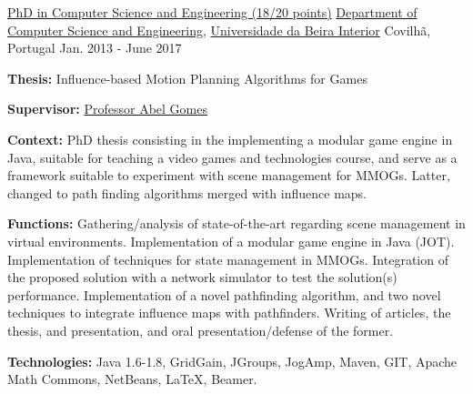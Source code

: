 

\begin{cventries}

  \cventry
    {\href{https://www.ubi.pt/en/course/849}{PhD in Computer Science and Engineering (18/20 points)}} %
    {\href{https://www.di.ubi.pt/}{Department of Computer Science and Engineering}, \href{http://www.ubi.pt/}{Universidade da Beira Interior}} %
    {Covilh\~{a}, Portugal} %
    {Jan. 2013 - June 2017} %
    {
      \begin{cvitems} %
        \item {\textbf{Thesis:} Influence-based Motion Planning Algorithms for Games}
        \item {\textbf{Supervisor:} \href{http://www.di.ubi.pt/~agomes/}{Professor Abel Gomes}}
        \item {\textbf{Context:} PhD thesis consisting in the implementing a modular game engine in Java, suitable for teaching a video games and technologies course, and serve as a framework suitable to experiment with scene management for MMOGs. Latter, changed to path finding algorithms merged with influence maps.}
        \item {\textbf{Functions:} Gathering/analysis of state-of-the-art regarding scene management in virtual environments. Implementation of a modular game engine in Java (JOT). Implementation of techniques for state management in MMOGs. Integration of the proposed solution with a network simulator to test the solution(s) performance. Implementation of a novel pathfinding algorithm, and two novel techniques to integrate influence maps with pathfinders. Writing of articles, the thesis, and presentation, and oral presentation/defense of the former.}
        \item {\textbf{Technologies:} Java 1.6-1.8, GridGain, JGroups, JogAmp, Maven, GIT, Apache Math Commons, NetBeans, %
LaTeX, Beamer.} %
      \end{cvitems}
    }


\end{cventries}
